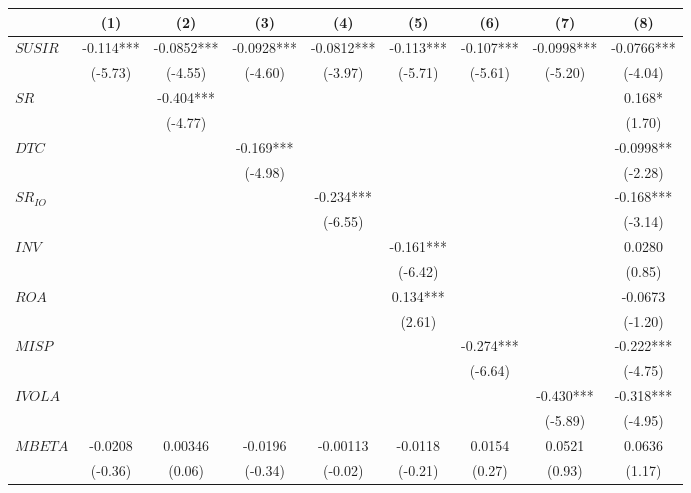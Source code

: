 \begin{tabular}{lcccccccc}
\hline
        & (1)     & (2)     & (3)     & (4)     & (5)     & (6)     & (7)     & (8) \bigstrut\\
\hline
$SUSIR$ & -0.114*** & -0.0852*** & -0.0928*** & -0.0812*** & -0.113*** & -0.107*** & -0.0998*** & -0.0766*** \bigstrut[t]\\
        & (-5.73) & (-4.55) & (-4.60) & (-3.97) & (-5.71) & (-5.61) & (-5.20) & (-4.04) \\
$SR$    &         & -0.404*** &         &         &         &         &         & 0.168* \\
        &         & (-4.77) &         &         &         &         &         & (1.70) \\
$DTC$   &         &         & -0.169*** &         &         &         &         & -0.0998** \\
        &         &         & (-4.98) &         &         &         &         & (-2.28) \\
$SR_{IO}$ &         &         &         & -0.234*** &         &         &         & -0.168*** \\
        &         &         &         & (-6.55) &         &         &         & (-3.14) \\
$INV$   &         &         &         &         & -0.161*** &         &         & 0.0280 \\
        &         &         &         &         & (-6.42) &         &         & (0.85) \\
$ROA$   &         &         &         &         & 0.134*** &         &         & -0.0673 \\
        &         &         &         &         & (2.61)  &         &         & (-1.20) \\
$MISP$  &         &         &         &         &         & -0.274*** &         & -0.222*** \\
        &         &         &         &         &         & (-6.64) &         & (-4.75) \\
$IVOLA$ &         &         &         &         &         &         & -0.430*** & -0.318*** \\
        &         &         &         &         &         &         & (-5.89) & (-4.95) \\
$MBETA$ & -0.0208 & 0.00346 & -0.0196 & -0.00113 & -0.0118 & 0.0154  & 0.0521  & 0.0636 \\
        & (-0.36) & (0.06)  & (-0.34) & (-0.02) & (-0.21) & (0.27)  & (0.93)  & (1.17) \\

\end{tabular}
